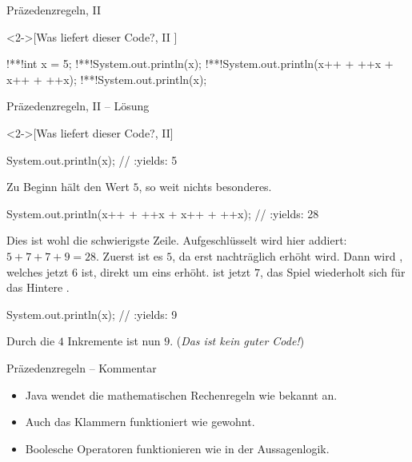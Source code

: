 \begin{frame}[fragile,c]{Präzedenzregeln, II}
\begin{exercise}<2->[Was liefert dieser Code?, II ]
    \begin{plainjava}[columns={[c]fullflexible}]
!**!int x = 5;
!**!System.out.println(x);
!**!System.out.println(x++ + ++x + x++ + ++x);
!**!System.out.println(x);
    \end{plainjava}
\end{exercise}
\end{frame}

\begin{frame}[fragile,c]{Präzedenzregeln, II -- Lösung}
    \begin{solve}<2->[Was liefert dieser Code?, II]
        \pause{}\begin{plainjava}[columns={[c]fullflexible}]
System.out.println(x); // :yields: 5
        \end{plainjava}
        \pause{}Zu Beginn hält  den Wert \(5\), so weit nichts besonderes.
        \begin{plainjava}[columns={[c]fullflexible}]
System.out.println(x++ + ++x + x++ + ++x); // :yields: 28
        \end{plainjava}
        \pause{}Dies ist wohl die schwierigste Zeile.\pause{} Aufgeschlüsselt wird hier addiert: \(5 + 7 + 7 + 9 = 28\).\pause{} Zuerst ist es \(5\), da  erst nachträglich erhöht wird.\pause{} Dann wird , welches jetzt \(6\) ist, direkt um eins erhöht.\pause{}  ist jetzt \(7\), das Spiel wiederholt sich für das Hintere .\pause{}
        \begin{plainjava}[columns={[c]fullflexible}]
System.out.println(x); // :yields: 9
        \end{plainjava}
        \pause{}Durch die \(4\) Inkremente ist  nun \(9\).\pause{} (\textit{Das ist \emph{kein} guter Code!})
    \end{solve}
\end{frame}
\fi

\begin{frame}{Präzedenzregeln -- Kommentar}
    \begin{itemize}[<+(1)->]
        \widei
        \item Java wendet die mathematischen Rechenregeln wie bekannt an.
        \item Auch das Klammern funktioniert wie gewohnt.
        \item Boolesche Operatoren funktionieren wie in der Aussagenlogik.
    \end{itemize}
\end{frame}

